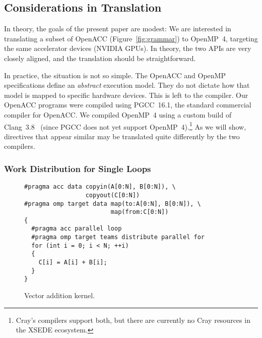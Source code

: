 \documentclass{sig-alternate-05-2015}
\begin{document}
\subsection{Considerations in Translation}
In theory, the goals of the present paper are modest: We are interested in
translating a subset of OpenACC (Figure~\ref{fig:grammar}) to OpenMP~4,
targeting the same accelerator devices (NVIDIA GPUs).  In theory, the two APIs
are very closely aligned, and the translation should be straightforward.

In practice, the situation is not so simple.  The OpenACC and OpenMP
specifications define an \emph{abstract} execution model.  They do not dictate
how that model is mapped to specific hardware devices.  This is left to the
compiler.  Our OpenACC programs were compiled using PGCC~16.1, the standard
commercial compiler for OpenACC\@.  We compiled OpenMP~4 using a custom build
of Clang~3.8~\cite{clang} (since PGCC does not yet support
OpenMP~4).\footnote{Cray's compilers support both, but there are currently no
Cray resources in the XSEDE ecosystem.}  As we will show, directives that
appear similar may be translated quite differently by the two compilers.

\subsubsection{Work Distribution for Single Loops}

\begin{figure}
\begin{center}
\begin{minipage}{4in}
{\footnotesize
\begin{verbatim}
#pragma acc data copyin(A[0:N], B[0:N]), \
                 copyout(C[0:N])
#pragma omp target data map(to:A[0:N], B[0:N]), \
                        map(from:C[0:N])
{
  #pragma acc parallel loop
  #pragma omp target teams distribute parallel for
  for (int i = 0; i < N; ++i)
  {
    C[i] = A[i] + B[i];
  }
}
\end{verbatim}
}
\end{minipage}
\end{center}
\caption{Vector addition kernel.}
\label{fig:vecadd}
\end{figure}
\end{document}
